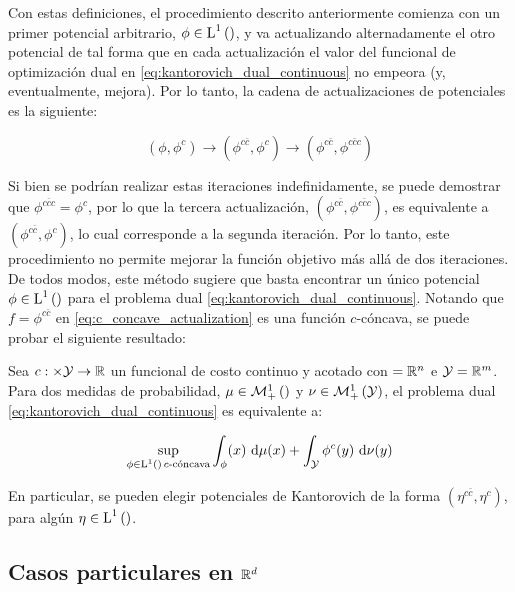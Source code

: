 Con estas definiciones, el procedimiento descrito anteriormente comienza con un primer potencial arbitrario, $\phi\in \operatorname{L}^{1}\left(\right)$, y va actualizando alternadamente el otro potencial de tal forma que en cada actualización el valor del funcional de optimización dual en \eqref{eq:kantorovich_dual_continuous} no empeora (y, eventualmente, mejora). Por lo tanto, la cadena de actualizaciones de potenciales es la siguiente:

\begin{equation}
	\label{eq:c_concave_actualization}
	(\phi,\phi^c) \to (\phi^{c\bar c}, \phi^c) \to (\phi^{c\bar c}, \phi^{c\bar c c})
\end{equation}

Si bien se podrían realizar estas iteraciones indefinidamente, se puede demostrar que $\phi^{c\bar c c} = \phi^c$, por lo que la tercera actualización, $(\phi^{c\bar c}, \phi^{c\bar c c})$, es equivalente a $(\phi^{c\bar c}, \phi^c)$, lo cual corresponde a la segunda iteración. Por lo tanto, este procedimiento no permite mejorar la función objetivo más allá de dos iteraciones. De todos modos, este método sugiere que basta encontrar un único potencial $\phi\in \operatorname{L}^{1}\left(\right)$ para el problema dual \eqref{eq:kantorovich_dual_continuous}. Notando que $f=\phi^{c\bar c}$ en \eqref{eq:c_concave_actualization} es una función $c$-cóncava, se puede probar el siguiente resultado:

\begin{teo}
	\label{teo:dual_c_transform}
	Sea $c:\times\mathcal{Y}\to\mathbb{R}$ un funcional de costo continuo y acotado con $=\mathbb{R}^n$ e $\mathcal{Y}=\mathbb{R}^m$. Para dos medidas de probabilidad, $\mu\in\mathcal{M}_+^1\left(\right)$ y $\nu\in\mathcal{M}_+^1\left(\mathcal{Y}\right)$, el problema dual \eqref{eq:kantorovich_dual_continuous} es equivalente a:

	\begin{equation*}
		\sup_{\phi\in \operatorname{L}^{1}\left(\right)\, c\text{-cóncava}} \int_ \phi(x) \,\operatorname{d}\!\mu(x) + \int_{\mathcal{Y}} \phi^c(y) \,\operatorname{d}\!\nu(y)
	\end{equation*}

	En particular, se pueden elegir potenciales de Kantorovich de la forma $(\eta^{c \bar c},\eta^c)$, para algún $\eta\in\operatorname{L}^{1}\left(\right)$.
\end{teo}

\subsection{Casos particulares en \texorpdfstring{$\mathbb{R}^d$}{Rd}}
\label{ot/kantorovich/rd}

